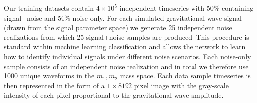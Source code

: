 \documentclass[%
showpacs,
 amsmath,amssymb,
 aps,
 twocolumn,
 prl,
 reprint,
floatfix,
]{revtex4-1}
\begin{document}
%
%
Our training datasets contain $4\times 10^{5}$ independent timeseries with 50\%
containing signal+noise and 50\% noise-only. For each simulated
gravitational-wave signal (drawn from the signal parameter space) we generate
25 independent noise realizations from which 25 signal+noise samples are
produced. This procedure is standard within machine learning classification and
allows the network to learn how to identify individual signals under different
noise scenarios. Each noise-only sample consists of an independent noise
realization and in total we therefore use 1000 unique waveforms in the
$m_{1},m_{2}$ mass space. Each data sample timeseries is then represented in
the form of a $1 \times 8192$ pixel image with the gray-scale intensity of each
pixel proportional to the gravitational-wave amplitude.

%
%
\end{document}
